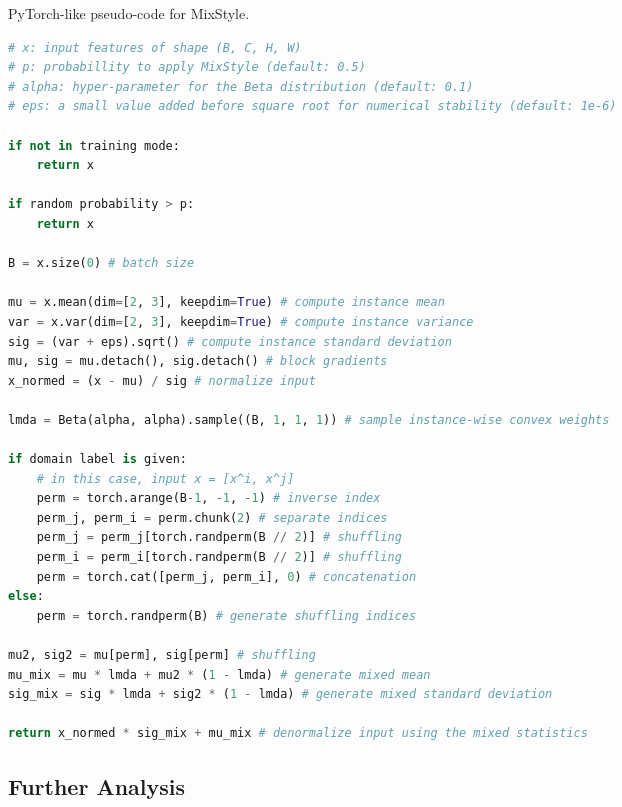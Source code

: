 \documentclass{article} \usepackage{iclr2021_conference,times}
\begin{document}
\begin{algorithm}[h]
\caption{PyTorch-like pseudo-code for MixStyle.}
\label{alg:mixstyle_pytorch}
\begin{lstlisting}[language=python]
# x: input features of shape (B, C, H, W)
# p: probabillity to apply MixStyle (default: 0.5)
# alpha: hyper-parameter for the Beta distribution (default: 0.1)
# eps: a small value added before square root for numerical stability (default: 1e-6)

if not in training mode:
    return x

if random probability > p:
    return x

B = x.size(0) # batch size

mu = x.mean(dim=[2, 3], keepdim=True) # compute instance mean
var = x.var(dim=[2, 3], keepdim=True) # compute instance variance
sig = (var + eps).sqrt() # compute instance standard deviation
mu, sig = mu.detach(), sig.detach() # block gradients
x_normed = (x - mu) / sig # normalize input

lmda = Beta(alpha, alpha).sample((B, 1, 1, 1)) # sample instance-wise convex weights

if domain label is given:
    # in this case, input x = [x^i, x^j]
    perm = torch.arange(B-1, -1, -1) # inverse index
    perm_j, perm_i = perm.chunk(2) # separate indices
    perm_j = perm_j[torch.randperm(B // 2)] # shuffling
    perm_i = perm_i[torch.randperm(B // 2)] # shuffling
    perm = torch.cat([perm_j, perm_i], 0) # concatenation
else:
    perm = torch.randperm(B) # generate shuffling indices

mu2, sig2 = mu[perm], sig[perm] # shuffling
mu_mix = mu * lmda + mu2 * (1 - lmda) # generate mixed mean
sig_mix = sig * lmda + sig2 * (1 - lmda) # generate mixed standard deviation

return x_normed * sig_mix + mu_mix # denormalize input using the mixed statistics
\end{lstlisting}
\end{algorithm}

\clearpage
\subsection{Further Analysis} \label{appx:further_analysis}
\end{document}
